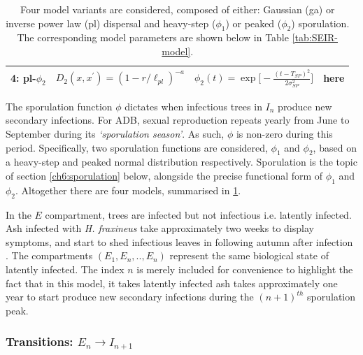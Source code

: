 \begin{landscape}
\begin{table}[]
\begin{tabular}{ | p{1.5cm} | p{5.0cm} | p{5.5cm} | p{3cm} | }
 4: pl-$\phi_2$ & $D_2(x, x^{\prime}) = (1 - r/\ell_{pl})^{-a}$ & $\phi_2(t) = \exp\Big[-\frac{(t - T_{SP})^2}{2\sigma_{SP}^2}\Big]$ &here \\
 \hline
 \end{tabular}
  \caption{Four model variants are considered, composed of either: Gaussian (ga) or inverse power law (pl) dispersal and heavy-step ($\phi_1$) or peaked ($\phi_2$) sporulation.
The corresponding model parameters are shown below in Table \ref{tab:SEIR-model}.}
\label{tab:model-variants}
\end{table}
\end{landscape}

The sporulation function $\phi$ dictates when infectious trees in $I_n$ produce new secondary infections. 
For ADB, sexual reproduction repeats yearly from June to September during its \textit{`sporulation season'}.
As such, $\phi$ is non-zero during this period.
Specifically, two sporulation functions are considered, $\phi_1$ and $\phi_2$, based on a heavy-step and peaked normal distribution respectively.
Sporulation is the topic of section \ref{ch6:sporulation} below, alongside the precise functional form of $\phi_1$ and $\phi_2$.
Altogether there are four models, summarised in \ref{tab:model-variants}.

In the $E$ compartment, trees are infected but not infectious i.e. latently infected.
Ash infected with \textit{H. fraxineus} take approximately two weeks to display symptoms,
and start to shed infectious leaves in following autumn after infection \cite{gross2014h}.
The compartments $(E_1, E_n,..,E_n)$ represent the same biological state of latently infected.
The index $n$ is merely included for convenience to highlight the fact that in this model, it takes latently infected ash takes approximately one year to start produce new secondary infections during the $(n+1)^{th}$ sporulation peak.


\subsubsection{Transitions: $E_n\rightarrow I_{n+1}$}

